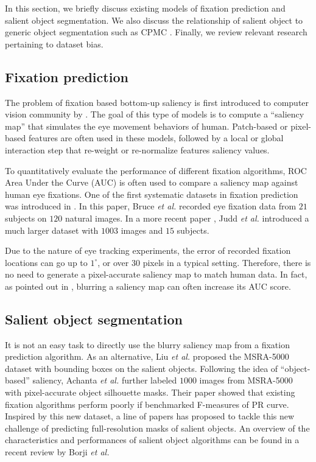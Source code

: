 In this section, we briefly discuss existing models of fixation prediction and salient object segmentation. We also discuss the relationship of salient object to generic object segmentation such as CPMC \cite{carreira2010constrained, li2010object}.  Finally, we review relevant research pertaining to dataset bias.

\subsection{Fixation prediction}
The problem of fixation based bottom-up saliency is first introduced to computer vision community by \cite{itti1998model}.  The goal of this type of models is to compute a ``saliency map'' that simulates the eye movement behaviors of human.  Patch-based \cite{itti1998model, bruce2005saliency, harel2006graph, hou2008dynamic, zhang2008sun} or pixel-based \cite{hou2012image, garcia2012relationship} features are often used in these models, followed by a local or global interaction step that re-weight or re-normalize features saliency values.

To quantitatively evaluate the performance of different fixation algorithms, ROC Area Under the Curve (AUC) is often used to compare a saliency map against human eye fixations. One of the first systematic datasets in fixation prediction was introduced in \cite{bruce2005saliency}.  In this paper, Bruce \emph{et al.} recorded eye fixation data from $21$ subjects on $120$ natural images.  In a more recent paper \cite{judd2009learning}, Judd \emph{et al.} introduced a much larger dataset with $1003$ images and $15$ subjects.

Due to the nature of eye tracking experiments, the error of recorded fixation locations can go up to $1^\circ$, or over $30$ pixels in a typical setting.  Therefore, there is no need to generate a pixel-accurate saliency map to match human data.  In fact, as pointed out in \cite{hou2012image}, blurring a saliency map can often increase its AUC score.


\subsection{Salient object segmentation}
It is not an easy task to directly use the blurry saliency map from a fixation prediction algorithm.  As an alternative, Liu \emph{et al.} \cite{liu2007learning} proposed the MSRA-5000 dataset with bounding boxes on the salient objects. Following the idea of ``object-based'' saliency, Achanta \emph{et al.} \cite{achanta2009frequency} further labeled $1000$ images from MSRA-5000 with pixel-accurate object silhouette masks.  Their paper showed that existing fixation algorithms perform poorly if benchmarked F-measures of PR curve.  Inspired by this new dataset, a line of papers has proposed \cite{cheng2011global, perazzi2012saliency, margolin2013makes} to tackle this new challenge of predicting full-resolution masks of salient objects.  An overview of the characteristics and performances of salient object algorithms can be found in a recent review \cite{borji2012salient} by Borji \emph{et al.}

